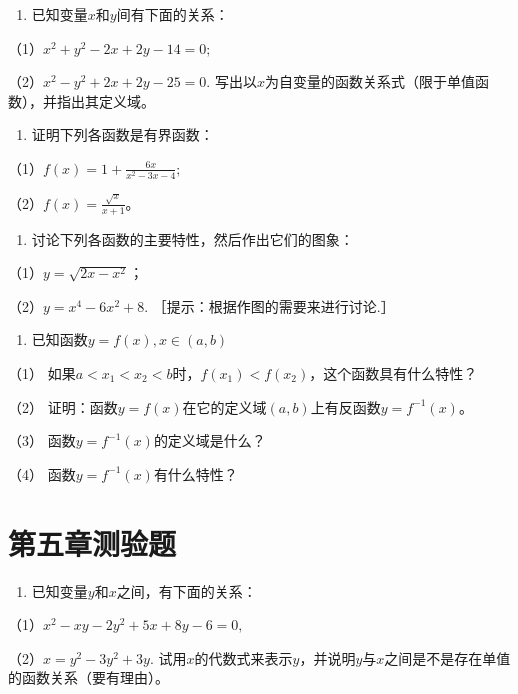 \begin{enumerate}[start=2]
\item
  已知变量\(x\)和\(y\)间有下面的关系：
\end{enumerate}

（1）\(x^{2} + y^{2} - 2x + 2y - 14 = 0;\)

（2）\(x^{2} - y^{2} + 2x + 2y - 25 = 0.\)
写出以\(x\)为自变量的函数关系式（限于单值函数），并指出其定义域。

\begin{enumerate}[start=3]
\item
  证明下列各函数是有界函数：
\end{enumerate}

（1）\(f(x) = 1 + \frac{6x}{x^2 - 3x - 4};\)

（2）\(f(x) = \frac{\sqrt{x}}{x + 1}\)。

\begin{enumerate}[start=4]
\item
  讨论下列各函数的主要特性，然后作出它们的图象：
\end{enumerate}

（1）\(y = \sqrt{2x - x^2}\)；

（2）\(y = x^{4} - 6x^{2} + 8.\) ［提示：根据作图的需要来进行讨论.］

\begin{enumerate}[start=5]
\item
  已知函数\(y = f(x), x \in (a, b)\)
\end{enumerate}

（1）
如果\(a < x_{1} < x_{2} < b\)时，\(f(x_{1}) < f(x_{2})\)，这个函数具有什么特性？

（2）
证明：函数\(y = f(x)\)在它的定义域\((a, b)\)上有反函数\(y = f^{-1}(x)\)。

（3） 函数\(y = f^{-1}(x)\)的定义域是什么？

（4） 函数\(y = f^{-1}(x)\)有什么特性？

\section{第五章测验题}

\begin{enumerate}
\item
  已知变量\(y\)和\(x\)之间，有下面的关系：
\end{enumerate}

（1）\(x^{2} - xy - 2y^{2} + 5x + 8y - 6 = 0,\)

（2）\(x = y^{2} - 3y^{2} + 3y.\)
试用\(x\)的代数式来表示\(y\)，并说明\(y\)与\(x\)之间是不是存在单值的函数关系（要有理由）。


